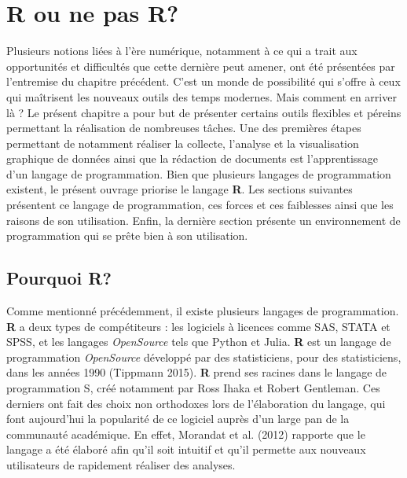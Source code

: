 \documentclass[
  letterpaper,
]{scrbook}
\begin{document}
\newpage{}


\hypertarget{sec-chap4}{%
\chapter{R ou ne pas R?}\label{sec-chap4}}

Plusieurs notions liées à l'ère numérique, notamment à ce qui a trait
aux opportunités et difficultés que cette dernière peut amener, ont été
présentées par l'entremise du chapitre précédent. C'est un monde de
possibilité qui s'offre à ceux qui maîtrisent les nouveaux outils des
temps modernes. Mais comment en arriver là ? Le présent chapitre a pour
but de présenter certains outils flexibles et péreins permettant la
réalisation de nombreuses tâches. Une des premières étapes permettant de
notamment réaliser la collecte, l'analyse et la visualisation graphique
de données ainsi que la rédaction de documents est l'apprentissage d'un
langage de programmation. Bien que plusieurs langages de programmation
existent, le présent ouvrage priorise le langage \textbf{R}. Les
sections suivantes présentent ce langage de programmation, ces forces et
ces faiblesses ainsi que les raisons de son utilisation. Enfin, la
dernière section présente un environnement de programmation qui se prête
bien à son utilisation.

\hypertarget{pourquoi-r}{%
\section{Pourquoi R?}\label{pourquoi-r}}

Comme mentionné précédemment, il existe plusieurs langages de
programmation. \textbf{R} a deux types de compétiteurs : les logiciels à
licences comme SAS, STATA et SPSS, et les langages \emph{OpenSource}
tels que Python et Julia. \textbf{R} est un langage de programmation
\emph{OpenSource} développé par des statisticiens, pour des
statisticiens, dans les années 1990 (Tippmann 2015). \textbf{R} prend
ses racines dans le langage de programmation S, créé notamment par Ross
Ihaka et Robert Gentleman. Ces derniers ont fait des choix non
orthodoxes lors de l'élaboration du langage, qui font aujourd'hui la
popularité de ce logiciel auprès d'un large pan de la communauté
académique. En effet, Morandat et al. (2012) rapporte que le langage a
été élaboré afin qu'il soit intuitif et qu'il permette aux nouveaux
utilisateurs de rapidement réaliser des analyses.
\end{document}
